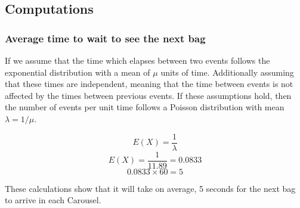 \documentclass[11pt]{article}
\begin{document}
\subsection{Computations}
\subsubsection{Average time to wait to see the next bag}

If we assume that the time which elapses between two events  follows the exponential distribution with a mean of $\mu$ units of time. Additionally assuming that these times are independent, meaning that the time between events is not affected by the times between previous events. If these assumptions hold, then the number of events per unit time follows a Poisson distribution with mean $\lambda = 1/\mu$.

\begin{mdframed}
\begin{center}
\begin{equation}
E(X)=\frac{1}{\lambda}
\end{equation}
\hspace{1cm}
\begin{equation}
E(X)=\frac{1}{11.89}=0.0833
\end{equation}
\hspace{1cm}
\begin{equation}
0.0833 \times 60 = 5
\end{equation}
\hspace{1cm}
\end{center}
\hspace{1cm}
\end{mdframed}
These calculations show that it will take on average, 5 seconds for the next bag to arrive in each Carousel.
\end{document}
